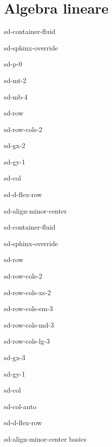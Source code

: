 \documentclass[letterpaper,10pt,english]{jupyterBook}
\begin{document}
\section{Algebra lineare}
\label{\detokenize{ch/linear_algebra:algebra-lineare}}\label{\detokenize{ch/linear_algebra:linear-algebra-high-school}}\label{\detokenize{ch/linear_algebra::doc}}
\sphinxstepscope

\begin{sphinxuseclass}{sd-container-fluid}
\begin{sphinxuseclass}{sd-sphinx-override}
\begin{sphinxuseclass}{sd-p-0}
\begin{sphinxuseclass}{sd-mt-2}
\begin{sphinxuseclass}{sd-mb-4}
\begin{sphinxuseclass}{sd-row}
\begin{sphinxuseclass}{sd-row-cols-2}
\begin{sphinxuseclass}{sd-gx-2}
\begin{sphinxuseclass}{sd-gy-1}
\begin{sphinxuseclass}{sd-col}
\begin{sphinxuseclass}{sd-d-flex-row}
\begin{sphinxuseclass}{sd-align-minor-center}
\begin{sphinxuseclass}{sd-container-fluid}
\begin{sphinxuseclass}{sd-sphinx-override}
\begin{sphinxuseclass}{sd-row}
\begin{sphinxuseclass}{sd-row-cols-2}
\begin{sphinxuseclass}{sd-row-cols-xs-2}
\begin{sphinxuseclass}{sd-row-cols-sm-3}
\begin{sphinxuseclass}{sd-row-cols-md-3}
\begin{sphinxuseclass}{sd-row-cols-lg-3}
\begin{sphinxuseclass}{sd-gx-3}
\begin{sphinxuseclass}{sd-gy-1}
\begin{sphinxuseclass}{sd-col}
\begin{sphinxuseclass}{sd-col-auto}
\begin{sphinxuseclass}{sd-d-flex-row}
\begin{sphinxuseclass}{sd-align-minor-center}
\sphinxAtStartPar
basics


\end{sphinxuseclass}
\end{sphinxuseclass}
\end{sphinxuseclass}
\end{sphinxuseclass}
\end{sphinxuseclass}
\end{sphinxuseclass}
\end{sphinxuseclass}
\end{sphinxuseclass}
\end{sphinxuseclass}
\end{sphinxuseclass}
\end{sphinxuseclass}
\end{sphinxuseclass}
\end{sphinxuseclass}
\end{sphinxuseclass}
\end{sphinxuseclass}
\end{sphinxuseclass}
\end{sphinxuseclass}
\end{sphinxuseclass}
\end{sphinxuseclass}
\end{sphinxuseclass}
\end{sphinxuseclass}
\end{sphinxuseclass}
\end{sphinxuseclass}
\end{sphinxuseclass}
\end{sphinxuseclass}
\end{sphinxuseclass}
\end{document}
